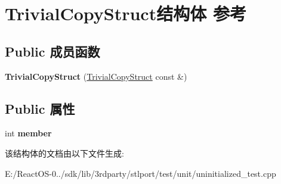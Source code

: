 \hypertarget{struct_trivial_copy_struct}{}\section{Trivial\+Copy\+Struct结构体 参考}
\label{struct_trivial_copy_struct}
\subsection*{Public 成员函数}
\begin{DoxyCompactItemize}
\item 
\mbox{\label{struct_trivial_copy_struct_ab70791144269c802b799f3b72fe1a248}} 
{\bfseries Trivial\+Copy\+Struct} (\hyperlink{struct_trivial_copy_struct}{Trivial\+Copy\+Struct} const \&)
\end{DoxyCompactItemize}
\subsection*{Public 属性}
\begin{DoxyCompactItemize}
\item 
\mbox{\label{struct_trivial_copy_struct_a8a6b9b5c3f97033effa1f4908450e033}} 
int {\bfseries member}
\end{DoxyCompactItemize}


该结构体的文档由以下文件生成\+:\begin{DoxyCompactItemize}
\item 
E\+:/\+React\+O\+S-\/0../sdk/lib/3rdparty/stlport/test/unit/uninitialized\+\_\+test.\+cpp\end{DoxyCompactItemize}
